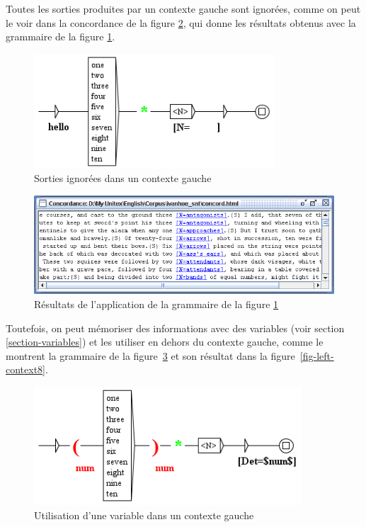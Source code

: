 \clearpage
\noindent Toutes les sorties produites par un contexte gauche sont ignorées, comme on peut le voir dans la concordance de la figure \ref{fig-left-context6}, qui donne les résultats
obtenus avec la grammaire de la figure \ref{fig-left-context5}.

\begin{figure}[!ht]
\begin{center}
\includegraphics[width=9cm]{resources/img/fig6-17e.png}
\caption{Sorties ignorées dans un contexte gauche\label{fig-left-context5}}
\end{center}
\end{figure}

\begin{figure}[!ht]
\begin{center}
\includegraphics[width=15cm]{resources/img/fig6-17f.png}
\caption{Résultats de l'application de la grammaire de la figure
\ref{fig-left-context5}\label{fig-left-context6}}
\end{center}
\end{figure}

\bigskip
\noindent Toutefois, on peut mémoriser des informations avec des variables (voir section
\ref{section-variables}) et les utiliser en dehors du contexte gauche, comme le montrent la
grammaire de la figure~\ref{fig-left-context7} et son résultat dans la figure~\ref{fig-left-context8}.

\begin{figure}[!ht]
\begin{center}
\includegraphics[width=10cm]{resources/img/fig6-17g.png}
\caption{Utilisation d'une variable dans un contexte gauche\label{fig-left-context7}}
\end{center}
\end{figure}

